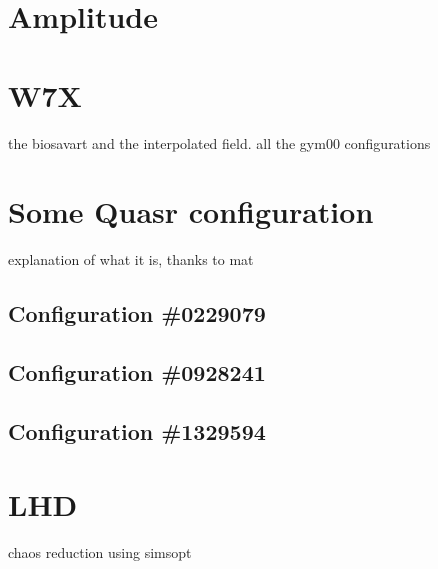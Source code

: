 
\chapter{Amplitude}

\chapter{W7X}
the biosavart and the interpolated field. all the gym00 configurations

\chapter{Some Quasr configuration}
explanation of what it is, thanks to mat
\section{Configuration \#0229079}
\section{Configuration \#0928241}
\section{Configuration \#1329594}

\chapter{LHD}
chaos reduction using simsopt

